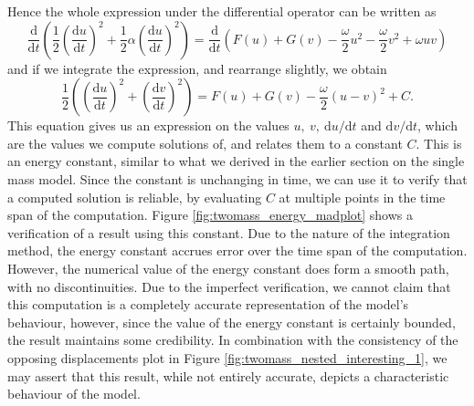 \documentclass{article}
\begin{document}
Hence the whole expression under the differential operator can be written as
\begin{equation*}
    \frac{\mathrm{d}}{\mathrm{d}t}\left(
        \frac{1}{2}\left(\frac{\mathrm{d}u}{\mathrm{d}t}\right)^2 + \frac{1}{2}\alpha\left(\frac{\mathrm{d}u}{\mathrm{d}t}\right)^2
    \right) = \frac{\mathrm{d}}{\mathrm{d}t}\left(
        F(u) + G(v) - \frac{\omega}{2}u^2 -\frac{\omega}{2}v^2 + \omega uv
    \right) 
\end{equation*}
and if we integrate the expression, and rearrange slightly, we obtain
\begin{equation}
    \frac{1}{2}\left(
        \left(\frac{\mathrm{d}u}{\mathrm{d}t}\right)^2 + \left(\frac{\mathrm{d}v}{\mathrm{d}t}\right)^2
    \right) = F(u) + G(v) - \frac{\omega}{2}(u-v)^2 + C.
    \label{eqn:twomass_energy_constant}
\end{equation}
This equation gives us an expression on the values \(u,~v,~\mathrm{d}u/\mathrm{d}t\) and \(\mathrm{d}v/\mathrm{d}t\),
which are the values we compute solutions of, and relates them to a constant $C$.
This is an energy constant, similar to what we derived in the earlier section on the single mass model.
Since the constant is unchanging in time, we can use it to verify that a computed solution is reliable,
by evaluating $C$ at multiple points in the time span of the computation.
Figure \ref{fig:twomass_energy_madplot} shows a verification of a result using this constant.
Due to the nature of the integration method,
the energy constant accrues error over the time span of the computation.
However, the numerical value of the energy constant does form a smooth path, with no discontinuities.
Due to the imperfect verification, we cannot claim that this computation is a completely accurate representation of the model's behaviour,
however, since the value of the energy constant is certainly bounded,
the result maintains some credibility.
In combination with the consistency of the opposing displacements plot in Figure \ref{fig:twomass_nested_interesting_1},
we may assert that this result, while not entirely accurate, depicts a characteristic behaviour of the model.




\end{document}
